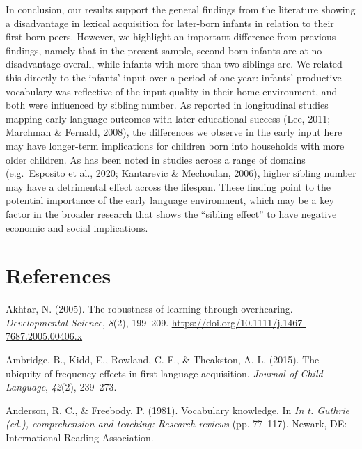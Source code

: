 \documentclass[man,floatsintext]{apa6}
\begin{document}
In conclusion, our results support the general findings from the literature showing a disadvantage in lexical acquisition for later-born infants in relation to their first-born peers. However, we highlight an important difference from previous findings, namely that in the present sample, second-born infants are at no disadvantage overall, while infants with more than two siblings are. We related this directly to the infants' input over a period of one year: infants' productive vocabulary was reflective of the input quality in their home environment, and both were influenced by sibling number. As reported in longitudinal studies mapping early language outcomes with later educational success (Lee, 2011; Marchman \& Fernald, 2008), the differences we observe in the early input here may have longer-term implications for children born into households with more older children. As has been noted in studies across a range of domains (e.g.~Esposito et al., 2020; Kantarevic \& Mechoulan, 2006), higher sibling number may have a detrimental effect across the lifespan. These finding point to the potential importance of the early language environment, which may be a key factor in the broader research that shows the \enquote{sibling effect} to have negative economic and social implications.

\newpage

\hypertarget{references}{%
\section{References}\label{references}}

\begingroup
\setlength{\parindent}{-0.5in}
\setlength{\leftskip}{0.5in}

\hypertarget{refs}{}
\leavevmode\hypertarget{ref-akhtar_robustness_2005}{}%
Akhtar, N. (2005). The robustness of learning through overhearing. \emph{Developmental Science}, \emph{8}(2), 199--209. \url{https://doi.org/10.1111/j.1467-7687.2005.00406.x}

\leavevmode\hypertarget{ref-ambridge_ubiquity_2015}{}%
Ambridge, B., Kidd, E., Rowland, C. F., \& Theakston, A. L. (2015). The ubiquity of frequency effects in first language acquisition. \emph{Journal of Child Language}, \emph{42}(2), 239--273.

\leavevmode\hypertarget{ref-anderson_vocabulary_1981}{}%
Anderson, R. C., \& Freebody, P. (1981). Vocabulary knowledge. In \emph{In t. Guthrie (ed.), comprehension and teaching: Research reviews} (pp. 77--117). Newark, DE: International Reading Association.
\end{document}
